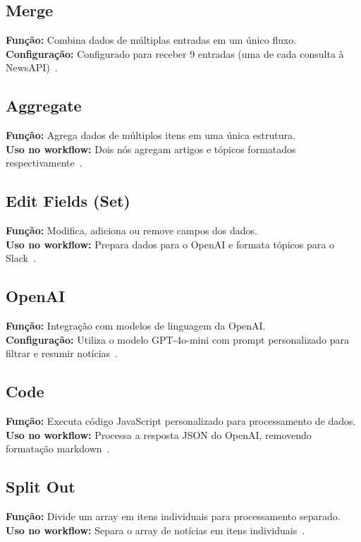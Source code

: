 \documentclass{sftex}
\begin{document}
\subsection{Merge}
\textbf{Função:} Combina dados de múltiplas entradas em um único fluxo.\\
\textbf{Configuração:} Configurado para receber 9 entradas (uma de cada consulta à NewsAPI)~\cite{n8n_merge}.

\subsection{Aggregate}
\textbf{Função:} Agrega dados de múltiplos itens em uma única estrutura.\\
\textbf{Uso no workflow:} Dois nós agregam artigos e tópicos formatados respectivamente~\cite{n8n_aggregate}.

\subsection{Edit Fields (Set)}
\textbf{Função:} Modifica, adiciona ou remove campos dos dados.\\
\textbf{Uso no workflow:} Prepara dados para o OpenAI e formata tópicos para o Slack~\cite{n8n_set}.

\subsection{OpenAI}
\textbf{Função:} Integração com modelos de linguagem da OpenAI.\\
\textbf{Configuração:} Utiliza o modelo GPT-4o-mini com prompt personalizado para filtrar e resumir notícias~\cite{n8n_openai}.

\subsection{Code}
\textbf{Função:} Executa código JavaScript personalizado para processamento de dados.\\
\textbf{Uso no workflow:} Processa a resposta JSON do OpenAI, removendo formatação markdown~\cite{n8n_code}.

\subsection{Split Out}
\textbf{Função:} Divide um array em itens individuais para processamento separado.\\
\textbf{Uso no workflow:} Separa o array de notícias em itens individuais~\cite{n8n_split_out}.
\end{document}
